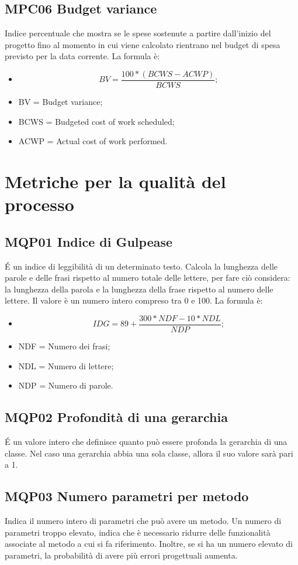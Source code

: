 \subsection{MPC06 Budget variance}
Indice percentuale che mostra se le spese sostenute a partire dall’inizio del progetto fino al momento in cui viene calcolato rientrano nel budget di spesa previsto per la data corrente.
La formula è:
\begin{itemize}
\item[] \[BV = \frac{100 * (BCWS - ACWP)}{BCWS};\]
\item BV = Budget variance;
\item BCWS = Budgeted cost of work scheduled;
\item ACWP = Actual cost of work performed.
\end{itemize}


\pagebreak

\section{Metriche per la qualità del processo}
\subsection{MQP01 Indice di Gulpease}
\'E un indice di leggibilità di un determinato testo. Calcola la lunghezza delle parole e delle frasi rispetto al numero totale delle lettere, per fare ciò considera: la lunghezza della parola e la lunghezza della frase rispetto al numero delle lettere. Il valore è un numero intero compreso tra 0 e 100.
La formula è:
\begin{itemize}
  \item[] \[IDG =  89 + \frac{300 * NDF - 10 * NDL}{NDP};\]
  \item NDF = Numero dei frasi;
  \item NDL = Numero di lettere;
  \item NDP = Numero di parole.
  \end{itemize}

\subsection{MQP02 Profondità di una gerarchia}
\'E un valore intero che definisce quanto può essere profonda la gerarchia di una classe. Nel caso una gerarchia abbia una sola classe, allora il suo valore sarà pari a 1.

\subsection{MQP03 Numero parametri per metodo}
Indica il numero intero di parametri che può avere un metodo. Un numero di parametri troppo elevato, indica che è necessario ridurre delle funzionalità associate al metodo a cui si fa riferimento. Inoltre, se si ha un numero elevato di parametri, la probabilità di avere più errori progettuali aumenta.

